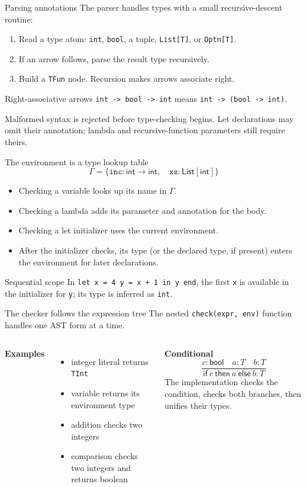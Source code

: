 \documentclass[aspectratio=169,11pt]{beamer}
\newcommand{\Int}{\mathsf{int}}
\newcommand{\Bool}{\mathsf{bool}}
\newcommand{\ListT}[1]{\mathsf{List}[#1]}
\begin{document}
\begin{frame}{Parsing annotations}
The parser handles types with a small recursive-descent routine:
\begin{enumerate}
  \item Read a type atom: \texttt{int}, \texttt{bool}, a tuple, \texttt{List[T]}, or \texttt{Optn[T]}.
  \item If an arrow follows, parse the result type recursively.
  \item Build a \texttt{TFun} node. Recursion makes arrows associate right.
\end{enumerate}
\begin{exampleblock}{Right-associative arrows}
\texttt{int -> bool -> int} means \texttt{int -> (bool -> int)}.
\end{exampleblock}
Malformed syntax is rejected before type-checking begins. Let declarations may omit their annotation; lambda and recursive-function parameters still require theirs.
\end{frame}

\begin{frame}{The environment is a type lookup table}
\[
\Gamma = \{\texttt{inc}:\Int\to\Int,\quad \texttt{xs}:\ListT{\Int}\}
\]
\begin{itemize}
  \item Checking a variable looks up its name in $\Gamma$.
  \item Checking a lambda adds its parameter and annotation for the body.
  \item Checking a let initializer uses the current environment.
  \item After the initializer checks, its type (or the declared type, if present) enters the environment for later declarations.
\end{itemize}
\begin{block}{Sequential scope}
In \texttt{let x = 4 y = x + 1 in y end}, the first \texttt{x} is available in the initializer for \texttt{y}; its type is inferred as \texttt{int}.
\end{block}
\end{frame}

\begin{frame}{The checker follows the expression tree}
The nested \texttt{check(expr, env)} function handles one AST form at a time.
\begin{columns}[T]
\textbf{Examples}
\begin{itemize}
  \item integer literal returns \texttt{TInt}
  \item variable returns its environment type
  \item addition checks two integers
  \item comparison checks two integers and returns boolean
\end{itemize}
\textbf{Conditional}
\[
\frac{c:\Bool\quad a:T\quad b:T}
     {\mathsf{if}\ c\ \mathsf{then}\ a\ \mathsf{else}\ b:T}
\]
The implementation checks the condition, checks both branches, then unifies their types.
\end{columns}
\end{frame}
\end{document}

